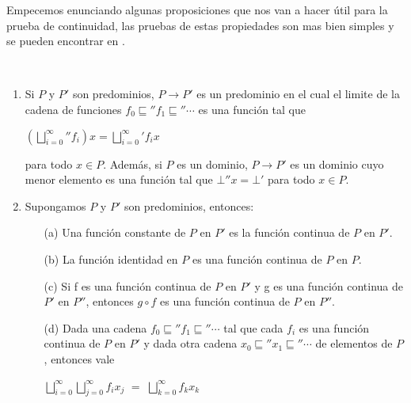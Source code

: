 Empecemos enunciando algunas proposiciones que nos van a hacer \'util para
la prueba de continuidad, las pruebas de estas propiedades son mas bien simples
y se pueden encontrar en \cite{reynolds2009theories}.

\begin{proposition}\

\begin{enumerate}

\item Si $P$ y $P'$ son predominios, $P \rightarrow P'$ es un predominio en
el cual el limite de la cadena de funciones $f_0 \sqsubseteq'' f_1 \sqsubseteq'' \cdots$ 
es una funci\'on tal que 

\begin{center}
$({\bigsqcup\limits^{\infty}_{i=0}}'' f_{i})x = {\bigsqcup\limits^{\infty}_{i=0}}' f_{i} x$
\end{center}

para todo $x \in P$. Adem\'as, si $P$ es un dominio, $P \rightarrow P'$ es un dominio
cuyo menor elemento es una funci\'on tal que $\bot'' x = \bot'$ para todo $x \in P$.

\item Supongamos $P$ y $P'$ son predominios, entonces:

\begin{enumerate}
\item[(a)] Una funci\'on constante de $P$ en $P'$ es la funci\'on continua de $P$ en $P'$.\\

\item[(b)] La funci\'on identidad en $P$ es una funci\'on continua de $P$ en $P$.\\

\item[(c)] Si f es una funci\'on continua de $P$ en $P'$ y g es una funci\'on
continua de $P'$ en $P''$, entonces $g \circ f$ es una funci\'on continua de $P$ en $P''$.\\

\item[(d)] Dada una cadena $f_0 \sqsubseteq'' f_1 \sqsubseteq'' \cdots$ tal que cada $f_i$ es una
funci\'on continua de $P$ en $P'$ y dada otra cadena $x_0 \sqsubseteq'' x_1 \sqsubseteq'' \cdots$ de
elementos de $P$, entonces vale

\begin{center}
${\bigsqcup\limits^{\infty}_{i=0}}{\bigsqcup\limits^{\infty}_{j=0}}f_i x_j$ $=$
${\bigsqcup\limits^{\infty}_{k=0}}f_k x_k$
\end{center}


\end{enumerate}
\end{enumerate}
\end{proposition}
